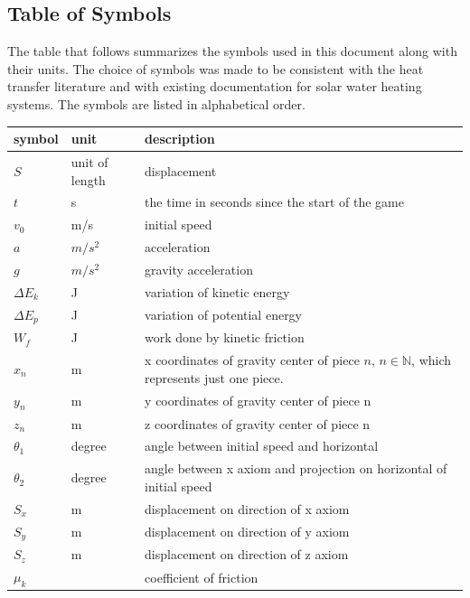 \documentclass[12pt]{article}
\begin{document}
	\subsection{Table of Symbols}
	
	The table that follows summarizes the symbols used in this document along with
	their units.  The choice of symbols was made to be consistent with the heat
	transfer literature and with existing documentation for solar water heating
	systems.  The symbols are listed in alphabetical order.
	
	\renewcommand{\arraystretch}{1.2}
	\noindent \begin{longtable*}{l l p{12cm}} \toprule
		\textbf{symbol} & \textbf{unit} & \textbf{description}\\
		\midrule 
		$S$ & unit of length & displacement
		\\
		$t$ & \si[per-mode=symbol] s & the time in seconds since the start of the game
		\\  
		$v_{0}$ & \si[per-mode=symbol] m/s & initial speed
		\\ 
		$a$ & $m/s^2$ & acceleration
		\\
		$g$ & $m/s^2$ & gravity acceleration
		\\
		$\Delta E_{k}$ & J & variation of kinetic energy
		\\
		$\Delta E_{p}$ & J & variation of potential energy
		\\
		$W_{f}$ & J & work done by kinetic friction
		\\
		$x_{n}$ & m & x coordinates of gravity center of piece $n$, $n \in \mathbb{N}$, which represents just one piece. 
		\\
		$y_{n}$ & m & y coordinates of gravity center of piece n
		\\
		$z_{n}$ & m & z coordinates of gravity center of piece n
		\\
		$\theta_{1}$ & degree & angle between initial speed and horizontal
		\\
		$\theta_{2}$ & degree & angle between
		x axiom and projection on horizontal of initial speed
		\\
		$S_{x}$ & m & displacement on direction of x axiom
		\\
		$S_{y}$ & m & displacement on direction of y axiom
		\\
		$S_{z}$ & m & displacement on direction of z axiom
		\\
		$\mu_k$ &  & coefficient of friction
		\\
		\bottomrule
	\end{longtable*}
	
\end{document}

